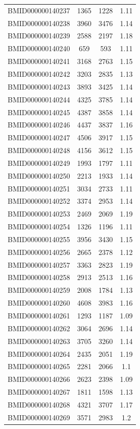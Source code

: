 \documentclass{bmcart}
\begin{document}
\begin{backmatter}
\begin{center}
\begin{longtable}{c|c|c|c}
BMID000000140237 & 1365 & 1228 & 1.11 \\
BMID000000140238 & 3960 & 3476 & 1.14 \\
BMID000000140239 & 2588 & 2197 & 1.18 \\
BMID000000140240 & 659 & 593 & 1.11 \\
BMID000000140241 & 3168 & 2763 & 1.15 \\
BMID000000140242 & 3203 & 2835 & 1.13 \\
BMID000000140243 & 3893 & 3425 & 1.14 \\
BMID000000140244 & 4325 & 3785 & 1.14 \\
BMID000000140245 & 4387 & 3858 & 1.14 \\
BMID000000140246 & 4437 & 3837 & 1.16 \\
BMID000000140247 & 4506 & 3917 & 1.15 \\
BMID000000140248 & 4156 & 3612 & 1.15 \\
BMID000000140249 & 1993 & 1797 & 1.11 \\
BMID000000140250 & 2213 & 1933 & 1.14 \\
BMID000000140251 & 3034 & 2733 & 1.11 \\
BMID000000140252 & 3374 & 2953 & 1.14 \\
BMID000000140253 & 2469 & 2069 & 1.19 \\
BMID000000140254 & 1326 & 1196 & 1.11 \\
BMID000000140255 & 3956 & 3430 & 1.15 \\
BMID000000140256 & 2665 & 2378 & 1.12 \\
BMID000000140257 & 3363 & 2823 & 1.19 \\
BMID000000140258 & 2913 & 2513 & 1.16 \\
BMID000000140259 & 2008 & 1784 & 1.13 \\
BMID000000140260 & 4608 & 3983 & 1.16 \\
BMID000000140261 & 1293 & 1187 & 1.09 \\
BMID000000140262 & 3064 & 2696 & 1.14 \\
BMID000000140263 & 3705 & 3260 & 1.14 \\
BMID000000140264 & 2435 & 2051 & 1.19 \\
BMID000000140265 & 2281 & 2066 & 1.1 \\
BMID000000140266 & 2623 & 2398 & 1.09 \\
BMID000000140267 & 1811 & 1598 & 1.13 \\
BMID000000140268 & 4321 & 3707 & 1.17 \\
BMID000000140269 & 3571 & 2983 & 1.2 \\

\end{longtable}
\end{center}
\end{backmatter}
\end{document}
